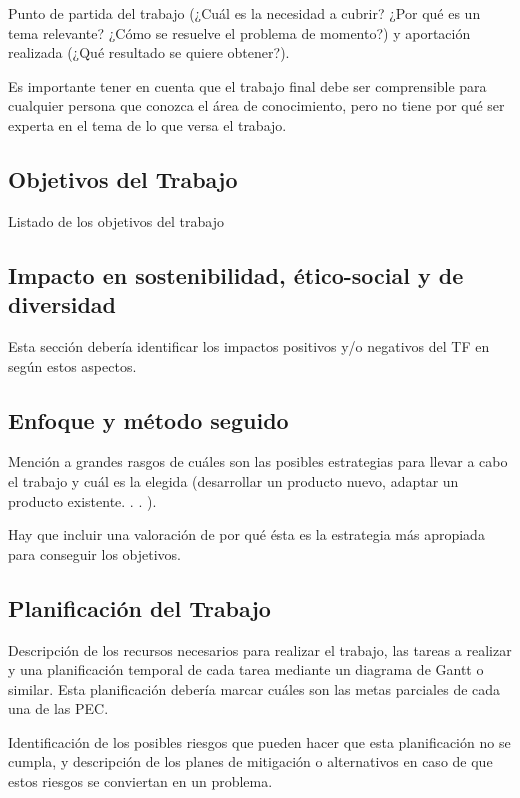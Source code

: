 \documentclass{uoc_memoria}
\begin{document}
\begin{guidancebox}
Punto de partida del trabajo (¿Cuál es la necesidad a cubrir? ¿Por qué es un tema relevante? ¿Cómo se resuelve el problema de momento?) y aportación realizada (¿Qué resultado se quiere obtener?).

Es importante tener en cuenta que el trabajo final debe ser comprensible para cualquier persona que conozca el área de conocimiento, pero no tiene por qué ser experta en el tema de lo que versa el trabajo.
\end{guidancebox}

\subsection{Objetivos del Trabajo}

\begin{guidancebox}
Listado de los objetivos del trabajo
\end{guidancebox}

\subsection{Impacto en sostenibilidad, ético-social y de diversidad}

\begin{guidancebox}
Esta sección debería identificar los impactos positivos y/o negativos del TF en según estos aspectos.
\end{guidancebox}

\subsection{Enfoque y método seguido}

\begin{guidancebox}
Mención a grandes rasgos de cuáles son las posibles estrategias para llevar a cabo el trabajo y cuál es la elegida (desarrollar un producto nuevo, adaptar un producto existente. . . ).

Hay que incluir una valoración de por qué ésta es la estrategia más apropiada para conseguir los objetivos.
\end{guidancebox}

\subsection{Planificación del Trabajo}

\begin{guidancebox}
Descripción de los recursos necesarios para realizar el trabajo, las tareas a realizar y una planificación temporal de cada tarea mediante un diagrama de Gantt o similar. Esta planificación debería marcar cuáles son las metas parciales de cada una de las PEC.

Identificación de los posibles riesgos que pueden hacer que esta planificación no se cumpla, y descripción de los planes de mitigación o alternativos en caso de que estos riesgos se conviertan en un problema.
\end{guidancebox}
\end{document}
